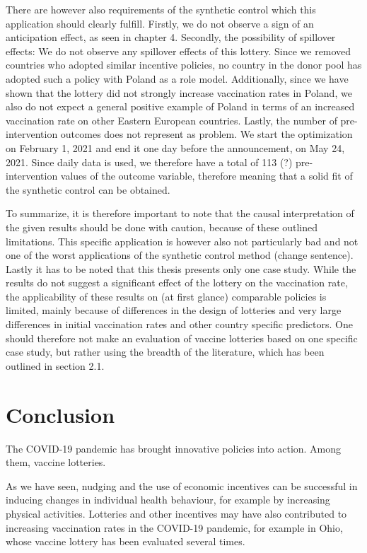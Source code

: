 \documentclass{scrbook}
\begin{document}
There are however also requirements of the synthetic control which this
application should clearly fulfill. Firstly, we do not observe a sign of
an anticipation effect, as seen in chapter 4. Secondly, the possibility
of spillover effects: We do not observe any spillover effects of this
lottery. Since we removed countries who adopted similar incentive
policies, no country in the donor pool has adopted such a policy with
Poland as a role model. Additionally, since we have shown that the
lottery did not strongly increase vaccination rates in Poland, we also
do not expect a general positive example of Poland in terms of an
increased vaccination rate on other Eastern European countries. Lastly,
the number of pre-intervention outcomes does not represent as problem.
We start the optimization on February 1, 2021 and end it one day before
the announcement, on May 24, 2021. Since daily data is used, we
therefore have a total of 113 (?) pre-intervention values of the outcome
variable, therefore meaning that a solid fit of the synthetic control
can be obtained.

To summarize, it is therefore important to note that the causal
interpretation of the given results should be done with caution, because
of these outlined limitations. This specific application is however also
not particularly bad and not one of the worst applications of the
synthetic control method (change sentence). Lastly it has to be noted
that this thesis presents only one case study. While the results do not
suggest a significant effect of the lottery on the vaccination rate, the
applicability of these results on (at first glance) comparable policies
is limited, mainly because of differences in the design of lotteries and
very large differences in initial vaccination rates and other country
specific predictors. One should therefore not make an evaluation of
vaccine lotteries based on one specific case study, but rather using the
breadth of the literature, which has been outlined in section 2.1.

\chapter{Conclusion}

The COVID-19 pandemic has brought innovative policies into action. Among
them, vaccine lotteries.

As we have seen, nudging and the use of economic incentives can be
successful in inducing changes in individual health behaviour, for
example by increasing physical activities. Lotteries and other
incentives may have also contributed to increasing vaccination rates in
the COVID-19 pandemic, for example in Ohio, whose vaccine lottery has
been evaluated several times.
\end{document}

